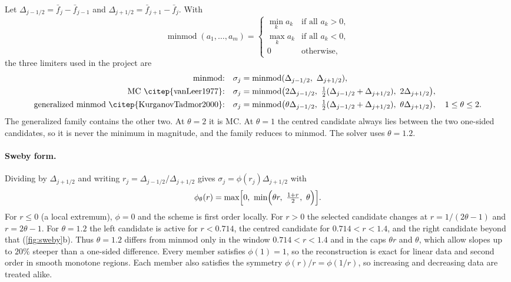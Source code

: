\documentclass[11pt]{article}
\theoremstyle{remark}
\newcommand{\minmod}{\operatorname{minmod}}
\begin{document}
Let $\Delta_{j-1/2} = \bar f_j - \bar f_{j-1}$ and $\Delta_{j+1/2} = \bar f_{j+1} - \bar f_j$.
With
\[
  \minmod(a_1,\dots,a_m) =
  \begin{cases}
  \min_k a_k & \text{if all } a_k>0,\\
  \max_k a_k & \text{if all } a_k<0,\\
  0 & \text{otherwise},
  \end{cases}
\]
the three limiters used in the project are
\begin{align}
  \text{minmod:}&\quad \sigma_j = \minmod(\Delta_{j-1/2},\ \Delta_{j+1/2}),\\
  \text{MC~\citep{vanLeer1977}:}&\quad \sigma_j = \minmod\bigl(2\Delta_{j-1/2},\ \tfrac12(\Delta_{j-1/2}+\Delta_{j+1/2}),\ 2\Delta_{j+1/2}\bigr),\\
  \text{generalized minmod~\citep{KurganovTadmor2000}:}&\quad
  \sigma_j = \minmod\bigl(\theta\Delta_{j-1/2},\ \tfrac12(\Delta_{j-1/2}+\Delta_{j+1/2}),\ \theta\Delta_{j+1/2}\bigr),\quad 1\le\theta\le2 .
  \label{eq:gminmod}
\end{align}
The generalized family contains the other two.  At $\theta=2$ it is MC.  At
$\theta=1$ the centred candidate always lies between the two one-sided candidates,
so it is never the minimum in magnitude, and the family reduces to minmod.  The
solver uses $\theta = 1.2$.

\paragraph{Sweby form.}  Dividing by $\Delta_{j+1/2}$ and writing
$r_j = \Delta_{j-1/2}/\Delta_{j+1/2}$ gives $\sigma_j = \phi(r_j)\Delta_{j+1/2}$ with
\begin{equation}
  \phi_\theta(r) = \max\Bigl[0,\ \min\Bigl(\theta r,\ \tfrac{1+r}{2},\ \theta\Bigr)\Bigr].
  \label{eq:phi}
\end{equation}
For $r\le0$ (a local extremum), $\phi=0$ and the scheme is first order locally.
For $r>0$ the selected candidate changes at $r = 1/(2\theta-1)$ and
$r = 2\theta-1$.  For $\theta = 1.2$ the left candidate is active for $r<0.714$,
the centred candidate for $0.714<r<1.4$, and the right candidate beyond that
(\cref{fig:sweby}b).  Thus $\theta = 1.2$ differs from minmod only in the window
$0.714<r<1.4$ and in the caps $\theta r$ and $\theta$, which allow slopes up to
$20\%$ steeper than a one-sided difference.  Every member satisfies $\phi(1)=1$, so
the reconstruction is exact for linear data and second order in smooth monotone
regions.  Each member also satisfies the symmetry $\phi(r)/r = \phi(1/r)$, so
increasing and decreasing data are treated alike.
\end{document}

